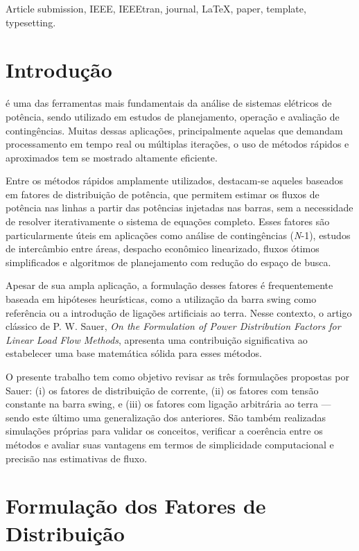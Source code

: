 \documentclass[journal]{IEEEtran}
\begin{document}
\begin{IEEEkeywords}
Article submission, IEEE, IEEEtran, journal, \LaTeX, paper, template, typesetting. %
\end{IEEEkeywords}

\section{Introdução}
 é uma das ferramentas mais fundamentais da análise de sistemas elétricos de potência, sendo utilizado em estudos de planejamento, operação e avaliação de contingências. Muitas dessas aplicações, principalmente aquelas que demandam processamento em tempo real ou múltiplas iterações, o uso de métodos rápidos e aproximados tem se mostrado altamente eficiente.

Entre os métodos rápidos amplamente utilizados, destacam-se aqueles baseados em fatores de distribuição de potência, que permitem estimar os fluxos de potência nas linhas a partir das potências injetadas nas barras, sem a necessidade de resolver iterativamente o sistema de equações completo. Esses fatores são particularmente úteis em aplicações como análise de contingências (\textit{N}-1), estudos de intercâmbio entre áreas, despacho econômico linearizado, fluxos ótimos simplificados e algoritmos de planejamento com redução do espaço de busca.

Apesar de sua ampla aplicação, a formulação desses fatores é frequentemente baseada em hipóteses heurísticas, como a utilização da barra swing como referência ou a introdução de ligações artificiais ao terra. Nesse contexto, o artigo clássico de P. W. Sauer, \textit{On the Formulation of Power Distribution Factors for Linear Load Flow Methods}, apresenta uma contribuição significativa ao estabelecer uma base matemática sólida para esses métodos.

O presente trabalho tem como objetivo revisar as três formulações propostas por Sauer: (i) os fatores de distribuição de corrente, (ii) os fatores com tensão constante na barra swing, e (iii) os fatores com ligação arbitrária ao terra — sendo este último uma generalização dos anteriores. São também realizadas simulações próprias para validar os conceitos, verificar a coerência entre os métodos e avaliar suas vantagens em termos de simplicidade computacional e precisão nas estimativas de fluxo.

\section{Formulação dos Fatores de Distribuição}
\end{document}
